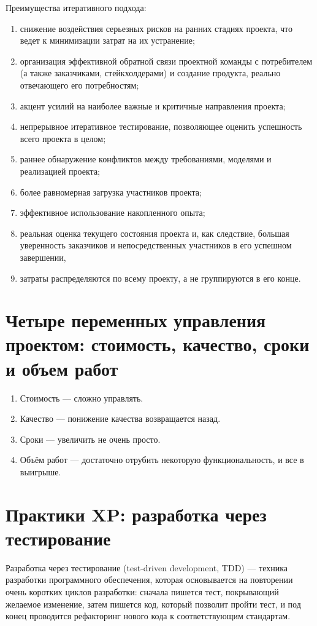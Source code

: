 \documentclass{article}
\let\stdsection\section
\renewcommand\section{\newpage\stdsection}
\begin{document}
    Преимущества итеративного подхода:
    \begin{enumerate}
        \item снижение воздействия серьезных рисков на ранних стадиях проекта, что ведет к минимизации затрат на их устранение;
        \item организация эффективной обратной связи проектной команды с потребителем (а также заказчиками, стейкхолдерами) и создание продукта, реально отвечающего его потребностям;
        \item акцент усилий на наиболее важные и критичные направления проекта;
        \item непрерывное итеративное тестирование, позволяющее оценить успешность всего проекта в целом;
        \item раннее обнаружение конфликтов между требованиями, моделями и реализацией проекта;
        \item более равномерная загрузка участников проекта;
        \item эффективное использование накопленного опыта;
        \item реальная оценка текущего состояния проекта и, как следствие, большая уверенность заказчиков и непосредственных участников в его успешном завершении,
        \item затраты распределяются по всему проекту, а не группируются в его конце.
    \end{enumerate}

\section{Четыре переменных управления проектом: стоимость, качество, сроки и объем работ}
    \begin{enumerate}
        \item Стоимость — сложно управлять.
        \item Качество — понижение качества возвращается назад.%
        \item Сроки — увеличить не очень просто.
        \item Объём работ — достаточно отрубить некоторую функциональность, и все в выигрыше.
    \end{enumerate}

\section{Практики XP: разработка через тестирование}
    Разработка через тестирование (test-driven development, TDD) — техника разработки программного обеспечения, которая основывается на повторении очень коротких циклов разработки: сначала пишется тест, покрывающий желаемое изменение, затем пишется код, который позволит пройти тест, и под конец проводится рефакторинг нового кода к соответствующим стандартам.
\end{document}
